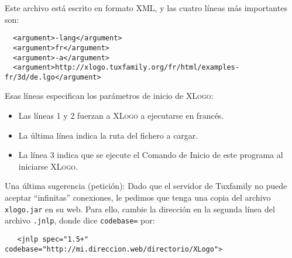 Este archivo est\'a escrito en formato XML, y las cuatro l\'ineas m\'as importantes
son:
\begin{verbatim}
  <argument>-lang</argument>
  <argument>fr</argument>
  <argument>-a</argument>
  <argument>http://xlogo.tuxfamily.org/fr/html/examples-fr/3d/de.lgo</argument>
\end{verbatim}
Esas l\'ineas especifican los par\'ametros de inicio de \textsc{XLogo}:
\begin{itemize}
   \item Las l\'ineas 1 y 2 fuerzan a \textsc{XLogo} a ejecutarse en franc\'es.
   \item La \'ultima línea indica la ruta del fichero a cargar.
   \item La l\'inea 3 indica que se ejecute el Comando de Inicio de este
      programa al iniciarse \textsc{XLogo}. 
\end{itemize}

Una \'ultima sugerencia (petici\'on): Dado que el servidor de Tuxfamily no puede
aceptar ``infinitas'' conexiones, le pedimos que tenga una copia del archivo
\texttt{xlogo.jar} en su web. Para ello, cambie la direcci\'on en la segunda
l\'inea del archivo \texttt{.jnlp}, donde dice \texttt{codebase=} por:
\begin{verbatim}
   <jnlp spec="1.5+" codebase="http://mi.direccion.web/directorio/XLogo">
\end{verbatim}
